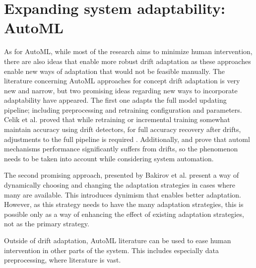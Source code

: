 \section{Expanding system adaptability: AutoML}

As for AutoML, while most of the research aims to minimize human intervention, there are also ideas that enable more robust drift adaptation as these approaches enable new ways of adaptation that would not be feasible manually. The literature concerning AutoML approaches for concept drift adaptation is very new and narrow, but two promising ideas regarding new ways to incorporate adaptability have appeared. The first one adapts the full model updating pipeline; including preprocessing and retraining configuration and parameters. Celik et al. proved that while retraining or incremental training somewhat maintain accuracy using drift detectors, for full accuracy recovery after drifts, adjustments to the full pipeline is required \cite{celikAdaptationStrategiesAutomated2021}. Additionally, \cite{celikAdaptationStrategiesAutomated2021} and \cite{madridAutoMLPresenceDrift2019} prove that automl mechanisms performance significantly suffers from drifts, so the phenomenon needs to be taken into account while considering system automation. 


The second promising approach, presented by Bakirov et al. \cite{bakirovAutomatedAdaptationStrategies2021} present a way of dynamically choosing and changing the adaptation strategies in cases where many are available. This introduces dynimism that enables better adaptation. However, as this strategy needs to have the many adaptation strategies, this is possible only as a way of enhancing the effect of existing adaptation strategies, not as the primary strategy.

Outside of drift adaptation, AutoML literature can be used to ease human intervention in other parts of the system. This includes especially data preprocessing, where literature is vast.



